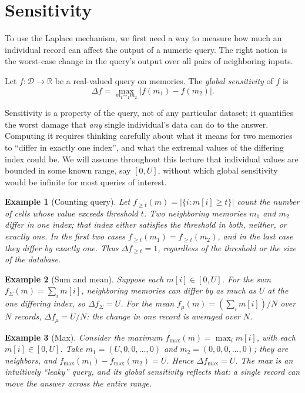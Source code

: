 \documentclass[11pt]{article}
\newcommand{\sens}{\Delta}
\newtheorem{example}[example]{Example}
\begin{document}
\section{Sensitivity}

To use the Laplace mechanism, we first need a way to measure how much an
individual record can affect the output of a numeric query.  The right notion
is the worst-case change in the query's output over all pairs of neighboring
inputs.

\begin{definition}
\label{def:sens}
Let $f : \mathcal{D} \to \mathbb{R}$ be a real-valued query on memories.  The
\emph{global sensitivity} of $f$ is
\[
  \sens f = \max_{m_1 \sim_1 m_2} |f(m_1) - f(m_2)|.
\]
\end{definition}

Sensitivity is a property of the query, not of any particular dataset; it
quantifies the worst damage that \emph{any} single individual's data can do
to the answer.  Computing it requires thinking carefully about what it means
for two memories to ``differ in exactly one index'', and what the extremal
values of the differing index could be.  We will assume throughout this
lecture that individual values are bounded in some known range, say $[0, U]$,
without which global sensitivity would be infinite for most queries of
interest.

\begin{example}[Counting query]
\label{ex:sens-count}
Let $f_{\geq t}(m) = |\{i : m[i] \geq t\}|$ count the number of cells whose
value exceeds threshold $t$.  Two neighboring memories $m_1$ and $m_2$ differ
in one index; that index either satisfies the threshold in both, neither, or
exactly one.  In the first two cases $f_{\geq t}(m_1) = f_{\geq t}(m_2)$, and
in the last case they differ by exactly one.  Thus
$\sens f_{\geq t} = 1$, regardless of the threshold or the size of the
database.
\end{example}

\begin{example}[Sum and mean]
\label{ex:sens-sum}
Suppose each $m[i] \in [0, U]$.  For the sum
$f_\Sigma(m) = \sum_i m[i]$, neighboring memories can differ by as much as
$U$ at the one differing index, so $\sens f_\Sigma = U$.  For the mean
$f_\mu(m) = (\sum_i m[i])/N$ over $N$ records, $\sens f_\mu = U/N$:
the change in one record is averaged over $N$.
\end{example}

\begin{example}[Max]
\label{ex:sens-max}
Consider the maximum $f_{\max}(m) = \max_i m[i]$, with each $m[i] \in [0, U]$.
Take $m_1 = (U, 0, 0, \ldots, 0)$ and $m_2 = (0, 0, 0, \ldots, 0)$; they are
neighbors, and $f_{\max}(m_1) - f_{\max}(m_2) = U$.  Hence
$\sens f_{\max} = U$.  The max is an intuitively ``leaky'' query, and its
global sensitivity reflects that: a single record can move the answer across
the entire range.
\end{example}
\end{document}
